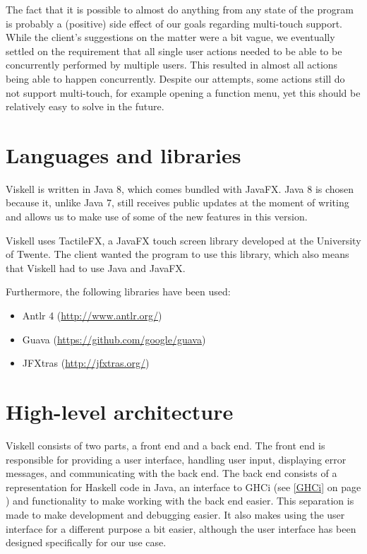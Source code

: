The fact that it is possible to almost do anything from any state of the program is probably a (positive) side effect of our goals regarding multi-touch support. While the client's suggestions on the matter were a bit vague, we eventually settled on the requirement that all single user actions needed to be able to be concurrently performed by multiple users. This resulted in almost all actions being able to happen concurrently. Despite our attempts, some actions still do not support multi-touch, for example opening a function menu, yet this should be relatively easy to solve in the future.

\section{Languages and libraries}
Viskell is written in Java 8, which comes bundled with JavaFX. 
Java 8 is chosen because it, unlike Java 7, still receives public updates at the moment of writing and allows us to make use of some of the new features in this version.

Viskell uses TactileFX, a JavaFX touch screen library developed at the University of Twente.
The client wanted the program to use this library, which also means that Viskell had to use Java and JavaFX.

Furthermore, the following libraries have been used:

\begin{itemize}
	\item Antlr 4 (\url{http://www.antlr.org/})
	\item Guava (\url{https://github.com/google/guava})
	\item JFXtras (\url{http://jfxtras.org/})
\end{itemize}

\section{High-level architecture}
Viskell consists of two parts, a front end and a back end.  
The front end is responsible for providing a user interface, handling user input, displaying error messages, and communicating with the back end.
The back end consists of a representation for Haskell code in Java, an interface to GHCi (see \ref{GHCi} on page \pageref{GHCi}) and functionality to make working with the back end easier.
This separation is made to make development and debugging easier.
It also makes using the user interface for a different purpose a bit easier, although the user interface has been designed specifically for our use case.

